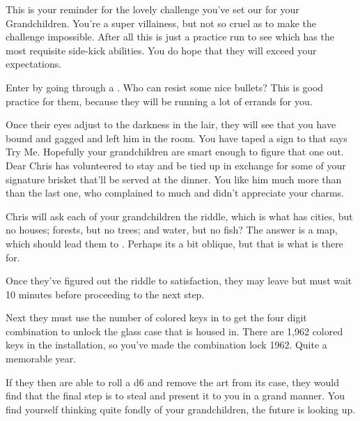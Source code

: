 \documentclass[green]{LRSguildcamp1}
\begin{document}
\name{\gGrandmasChallenge{}}

This is your reminder for the lovely challenge you've set our for your Grandchildren. You're a super villainess, but not so cruel as to make the challenge impossible. After all this is just a practice run to see which has the most requisite side-kick abilities. You do hope that they will exceed your expectations. 

Enter \pGrandmasLair{} by going through a \sBullets{}. Who can resist some nice bullets? This is good practice for them, because they will be running a lot of errands for you. 


Once their eyes adjust to the darkness in the lair, they will see that you have bound and gagged \cChrisHemsworth{} and left him in the room. You have taped a sign to \cChrisHemsworth{} that says Try Me. Hopefully your grandchildren are smart enough to figure that one out. Dear Chris has volunteered to stay and be tied up in exchange for some of your signature brisket that'll be served at the dinner. You like him much more than than the last one, who complained to much and didn't appreciate your charms. 


Chris will ask each of your grandchildren the riddle, which is what has cities, but no houses; forests, but no trees; and water, but no fish? The answer is a map, which should lead them to \iArtworkThree{}. Perhaps its a bit oblique, but that is what \cChrisHemsworth{} is there for. 

Once they've figured out the riddle to \cChrisHemsworth{} satisfaction, they may leave but must wait 10 minutes before proceeding to the next step. 

Next they must use the number of colored keys in \iArtworkThree{} to get the four digit combination to unlock the glass case that \iArtworkThree{} is housed in. There are 1,962 colored keys in the installation, so you've made the combination lock 1962. Quite a memorable year.  


If they then are able to roll a d6 and remove the art from its case, they would find that the final step is to steal \cOS{} \iBagofHolding{} and present it to you in a grand manner. You find yourself thinking quite fondly of your grandchildren, the future is looking up. 
\end{document}

